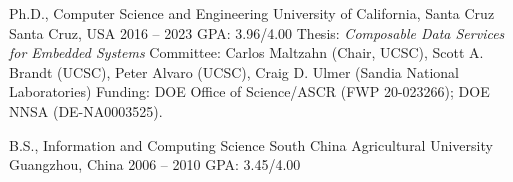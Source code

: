 

\begin{cventries}

  \cventry
    {Ph.D., Computer Science and Engineering} %
    {University of California, Santa Cruz} %
    {Santa Cruz, USA} %
    {2016 -- 2023} %
    {GPA: 3.96/4.00}
    {
      Thesis: \textit{Composable Data Services for Embedded Systems} \newline
      Committee: Carlos Maltzahn (Chair, UCSC), Scott A. Brandt (UCSC), Peter Alvaro (UCSC), Craig D. Ulmer (Sandia National Laboratories) \newline
      Funding: DOE Office of Science/ASCR (FWP 20-023266); DOE NNSA (DE-NA0003525).
    }

  \cventry
    {B.S., Information and Computing Science}
    {South China Agricultural University}
    {Guangzhou, China}
    {2006 -- 2010}
    {GPA: 3.45/4.00}

\end{cventries}

